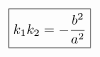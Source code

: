 \documentclass[preview]{standalone}
\begin{document}
\begin{align*}
\special{dvisvgm:raw <g id='unique000'>}\boxed{k_1k_2=-\frac{b^2}{a^2}}\special{dvisvgm:raw </g>}
\end{align*}
\end{document}
